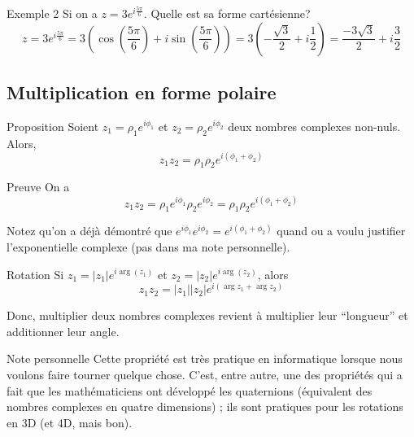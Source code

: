 \documentclass{article}
\begin{document}
\begin{parag}{Exemple 2}
    Si on a $z = 3 e^{i \frac{5\pi}{6}}$. Quelle est sa forme cartésienne?
    \[z = 3 e^{i \frac{5\pi}{6}} = 3\left(\cos\left( \frac{5\pi}{6}\right) + i\sin\left( \frac{5\pi}{6}\right)\right) = 3\left( - \frac{\sqrt{3}}{2} + i \frac{1}{2}\right) = \frac{-3\sqrt{3}}{2} + i \frac{3}{2}\]
\end{parag}


\subsection{Multiplication en forme polaire}

\begin{parag}{Proposition}
    Soient $z_1 = \rho_1 e^{i \phi_1}$ et $z_2 = \rho_2 e^{i \phi_2}$ deux nombres complexes non-nuls. Alors,
    \[z_1 z_2 = \rho_1 \rho_2 e^{i\left(\phi_1 + \phi_2\right)}\]

    \begin{subparag}{Preuve}
        On a
        \[z_1 z_2 = \rho_1 e^{i \phi_1} \rho_2 e^{i \phi_2} = \rho_1 \rho_2 e^{i\left(\phi_1 + \phi_2\right)}\]

        Notez qu'on a déjà démontré que $e^{i\phi_1}e^{i\phi_2} = e^{i\left(\phi_1 + \phi_2\right)}$ quand ou a voulu justifier l'exponentielle complexe (pas dans ma note personnelle).
    \end{subparag}

\end{parag}

\begin{parag}{Rotation}
    Si $z_1 = \left|z_1\right| e^{i\arg\left(z_1\right)}$ et $z_2 = \left|z_2\right| e^{i\arg\left(z_2\right)}$, alors
    \[z_1 z_2 = \left|z_1\right| \left|z_2\right| e^{i\left(\arg z_1 + \arg z_2\right)}\]

    Donc, multiplier deux nombres complexes revient à multiplier leur ``longueur'' et additionner leur angle.

    \begin{subparag}{Note personnelle}
        Cette propriété est très pratique en informatique lorsque nous voulons faire tourner quelque chose. C'est, entre autre, une des propriétés qui a fait que les mathématiciens ont développé les quaternions (équivalent des nombres complexes en quatre dimensions) ; ils sont pratiques pour les rotations en 3D (et 4D, mais bon).
    \end{subparag}
\end{parag}
\end{document}
